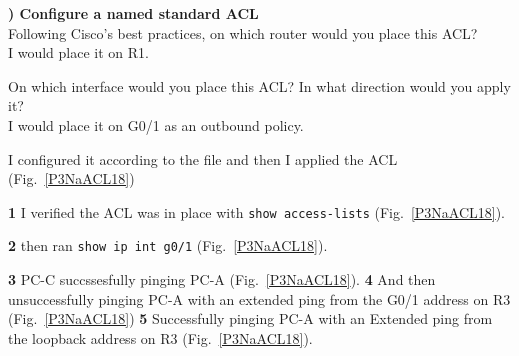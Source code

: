 \documentclass{report}
\newcommand{\mysubsection}[2]{\textbf{\romannumeral #1) #2}}
\begin{document}
\noindent\mysubsection{2}{Configure a named standard ACL}\\
Following Cisco's best practices, on which router would you place this ACL?\\
I would place it on R1.


On which interface would you place this ACL? In what direction would you apply
it?\\
I would place it on G0/1 as an outbound policy.


I configured it according to the file and then I applied the ACL (Fig.~\ref{P3NaACL18})

{\bf{1}}
I verified the ACL was in place with
{\scriptsize{\verb$show access-lists$}\normalsize}
(Fig.~\ref{P3NaACL18}).

{\bf{2}}
then ran
{\scriptsize{\verb$show ip int g0/1$}\normalsize}
(Fig.~\ref{P3NaACL18}).

{\bf{3}} PC-C succssesfully pinging PC-A (Fig.~\ref{P3NaACL18}).
{\bf{4}} And then unsuccessfully pinging PC-A with an extended ping from the
G0/1 address on R3 (Fig.~\ref{P3NaACL18})
{\bf{5}} Successfully pinging PC-A with an Extended ping from the loopback
address on R3 (Fig.~\ref{P3NaACL18}).
\end{document}
